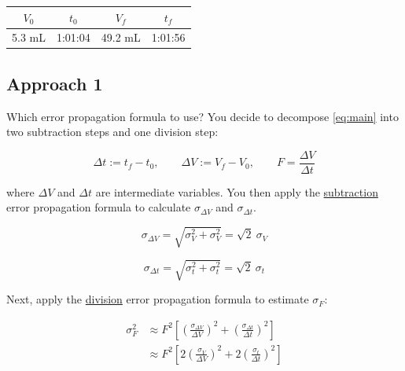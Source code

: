 \documentclass[12pt,twoside]{article}
\newcommand{\fillin}[1]{{\color{white} \large #1}}
\begin{document}
\begin{center}
\begin{tabular}{c c c c}
$V_{0}$ & $t_{0}$ & $V_{f}$ & $t_{f}$ \\ \hline
5.3 mL & 1:01:04 & 49.2 mL & 1:01:56 \\	
\end{tabular}
\end{center}

\vfill \pagebreak

\subsection{Approach 1}

Which error propagation formula to use? You decide to decompose \eqref{eq:main} into two subtraction steps and one division step:

\begin{equation}
	\Delta t := t_{f} - t_{0}, \qquad \Delta V := V_{f} - V_{0}, \qquad F = \frac{\Delta V}{\Delta t}
\end{equation}

where $\Delta V$ and $\Delta t$ are intermediate variables. You then apply the \underline{subtraction} error propagation formula to calculate $\sigma_{\Delta V}$ and $\sigma_{\Delta t}$.

\fillin{

\begin{equation*}
\sigma_{\Delta V} = \sqrt{\sigma_{V}^2 + \sigma_V^2} = \sqrt{2} ~ \sigma_{V}
\end{equation*}

\begin{equation*}
\sigma_{\Delta t} = \sqrt{\sigma_{t}^2 + \sigma_t^2} = \sqrt{2} ~ \sigma_{t}
\end{equation*}

}

\vspace{0.1\textheight}

Next, apply the \underline{division} error propagation formula to estimate $\sigma_F$:

\fillin{

\begin{align*}
\sigma_{F}^2 & \approx F^2 \left[ \left(\frac{\sigma_{\Delta V}}{\Delta V} \right)^2	+ \left(\frac{\sigma_{\Delta t}}{\Delta t} \right)^2 \right] \\
			& \approx F^2 \left[ 2 \left(\frac{\sigma_{V}}{\Delta V} \right)^2	+ 2 \left(\frac{\sigma_{t}}{\Delta t} \right)^2 \right]
\end{align*}

}
\end{document}
